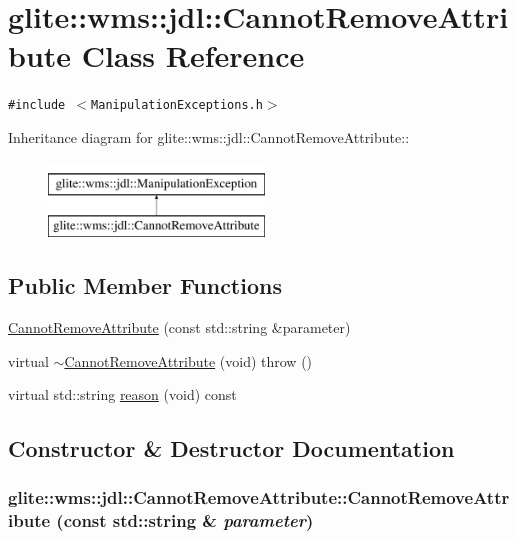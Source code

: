 \hypertarget{classglite_1_1wms_1_1jdl_1_1CannotRemoveAttribute}{
\section{glite::wms::jdl::Cannot\-Remove\-Attribute Class Reference}
\label{classglite_1_1wms_1_1jdl_1_1CannotRemoveAttribute}
}
{\tt \#include $<$Manipulation\-Exceptions.h$>$}

Inheritance diagram for glite::wms::jdl::Cannot\-Remove\-Attribute::\begin{figure}[H]
\begin{center}
\leavevmode
\includegraphics[height=2cm]{classglite_1_1wms_1_1jdl_1_1CannotRemoveAttribute}
\end{center}
\end{figure}
\subsection*{Public Member Functions}
\begin{CompactItemize}
\item 
\hyperlink{classglite_1_1wms_1_1jdl_1_1CannotRemoveAttribute_a0}{Cannot\-Remove\-Attribute} (const std::string \&parameter)
\item 
virtual \hyperlink{classglite_1_1wms_1_1jdl_1_1CannotRemoveAttribute_a1}{$\sim$Cannot\-Remove\-Attribute} (void)  throw ()
\item 
virtual std::string \hyperlink{classglite_1_1wms_1_1jdl_1_1CannotRemoveAttribute_a2}{reason} (void) const 
\end{CompactItemize}


\subsection{Constructor \& Destructor Documentation}
\hypertarget{classglite_1_1wms_1_1jdl_1_1CannotRemoveAttribute_a0}{
\subsubsection[CannotRemoveAttribute]{\setlength{\rightskip}{0pt plus 5cm}glite::wms::jdl::Cannot\-Remove\-Attribute::Cannot\-Remove\-Attribute (const std::string \& {\em parameter})}}
\label{classglite_1_1wms_1_1jdl_1_1CannotRemoveAttribute_a0}


